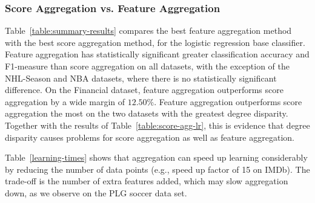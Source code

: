 \documentclass[conference]{IEEEtran}
\begin{document}
\begin{table}[ht]
\caption{Learning Time in Seconds}
\centering
{}
\label{learning-times}
\end{table}

\subsubsection{Score Aggregation vs. Feature Aggregation} Table~\ref{table:summary-results} compares the best feature aggregation method with the best score aggregation method, for the logistic regression base classifier.
Feature aggregation has statistically significant greater classification accuracy and F1-measure than score aggregation on all datasets, with the exception of the NHL-Season and NBA datasets, where there is no statistically significant difference. On the Financial dataset, feature aggregation outperforms score aggregation by a wide margin of $12.50\%$.
Feature aggregation outperforms score aggregation the most on the two datasets with the greatest degree disparity. Together with the results of Table~\ref{table:score-agg-lr}, this is evidence that degree disparity causes problems for score aggregation as well as feature aggregation.

Table~\ref{learning-times} shows that aggregation can speed up learning considerably by reducing the number of data points (e.g., speed up factor of 15 on IMDb). The trade-off is the number of extra features added, which may slow aggregation down, as we observe on the PLG soccer data set.
%

\end{document}
